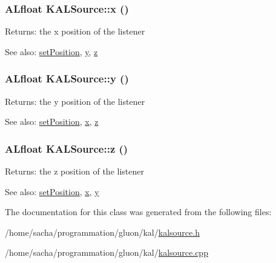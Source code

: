 \hypertarget{class_k_a_l_source_b276d46c5c13cf496bdc27d3d68b67dd}{
\subsubsection[{x}]{\setlength{\rightskip}{0pt plus 5cm}ALfloat KALSource::x ()}}
\label{class_k_a_l_source_b276d46c5c13cf496bdc27d3d68b67dd}


\begin{Desc}
\item[Returns:]the x position of the listener \end{Desc}
\begin{Desc}
\item[See also:]\hyperlink{class_k_a_l_source_17250a60d4a3328cb9120cb4d9749187}{setPosition}, \hyperlink{class_k_a_l_source_4caf310ccc6d374f14a1cbe08a15990b}{y}, \hyperlink{class_k_a_l_source_dc2a64105db92ed96d91ec42c49878a3}{z} \end{Desc}
\hypertarget{class_k_a_l_source_4caf310ccc6d374f14a1cbe08a15990b}{
\subsubsection[{y}]{\setlength{\rightskip}{0pt plus 5cm}ALfloat KALSource::y ()}}
\label{class_k_a_l_source_4caf310ccc6d374f14a1cbe08a15990b}


\begin{Desc}
\item[Returns:]the y position of the listener \end{Desc}
\begin{Desc}
\item[See also:]\hyperlink{class_k_a_l_source_17250a60d4a3328cb9120cb4d9749187}{setPosition}, \hyperlink{class_k_a_l_source_b276d46c5c13cf496bdc27d3d68b67dd}{x}, \hyperlink{class_k_a_l_source_dc2a64105db92ed96d91ec42c49878a3}{z} \end{Desc}
\hypertarget{class_k_a_l_source_dc2a64105db92ed96d91ec42c49878a3}{
\subsubsection[{z}]{\setlength{\rightskip}{0pt plus 5cm}ALfloat KALSource::z ()}}
\label{class_k_a_l_source_dc2a64105db92ed96d91ec42c49878a3}


\begin{Desc}
\item[Returns:]the z position of the listener \end{Desc}
\begin{Desc}
\item[See also:]\hyperlink{class_k_a_l_source_17250a60d4a3328cb9120cb4d9749187}{setPosition}, \hyperlink{class_k_a_l_source_b276d46c5c13cf496bdc27d3d68b67dd}{x}, \hyperlink{class_k_a_l_source_4caf310ccc6d374f14a1cbe08a15990b}{y} \end{Desc}


The documentation for this class was generated from the following files:\begin{CompactItemize}
\item 
/home/sacha/programmation/gluon/kal/\hyperlink{kalsource_8h}{kalsource.h}\item 
/home/sacha/programmation/gluon/kal/\hyperlink{kalsource_8cpp}{kalsource.cpp}\end{CompactItemize}

